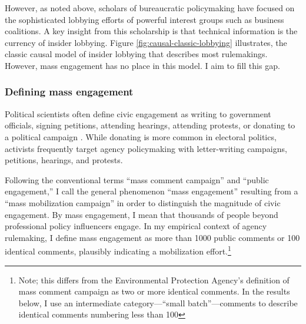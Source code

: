 However, as noted above, scholars of bureaucratic policymaking have focused on the sophisticated lobbying efforts of powerful interest groups such as business coalitions. A key insight from this scholarship is that technical information is the currency of insider lobbying. Figure \ref{fig:causal-classic-lobbying} illustrates, the classic causal model of insider lobbying that describes most rulemakings. However, mass engagement has no place in this model. I aim to fill this gap.






\subsubsection{Defining mass engagement}
Political scientists often define civic engagement as writing to government officials, signing petitions, attending hearings, attending protests, or donating to a political campaign \citep{Verba1987}. While donating is more common in electoral politics, activists frequently target agency policymaking with letter-writing campaigns, petitions, hearings, and protests. 

Following the conventional terms ``mass comment campaign'' and ``public engagement,'' I call the general phenomenon ``mass engagement'' resulting from a ``mass mobilization campaign'' in order to distinguish the magnitude of civic engagement.
By mass engagement, I mean that thousands of people beyond professional policy influencers engage. In my empirical context of agency rulemaking, I define mass engagement as more than 1000 public comments or 100 identical comments, plausibly indicating a mobilization effort.\footnote{Note; this differs from the Environmental Protection Agency's definition of mass comment campaign as two or more identical comments. In the results below, I use an intermediate category---``small batch''---comments to describe identical comments numbering less than 100}  

